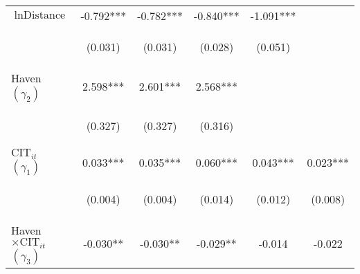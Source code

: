 \begin{center}
\begin{tabular}{lccccc}
$\ln\text{Distance (w)}$ & -0.792*** & -0.782*** & -0.840*** & -1.091*** &  \\
\vspace{4pt} & \begin{footnotesize}(0.031)\end{footnotesize} & \begin{footnotesize}(0.031)\end{footnotesize} & \begin{footnotesize}(0.028)\end{footnotesize} & \begin{footnotesize}(0.051)\end{footnotesize} & \begin{footnotesize}\end{footnotesize} \\
Haven $(\gamma_2)$ & 2.598*** & 2.601*** & 2.568*** &  &  \\
\vspace{4pt} & \begin{footnotesize}(0.327)\end{footnotesize} & \begin{footnotesize}(0.327)\end{footnotesize} & \begin{footnotesize}(0.316)\end{footnotesize} & \begin{footnotesize}\end{footnotesize} & \begin{footnotesize}\end{footnotesize} \\
$ \text{CIT}_{it}$ $(\gamma_1)$ & 0.033*** & 0.035*** & 0.060*** & 0.043*** & 0.023*** \\
\vspace{4pt} & \begin{footnotesize}(0.004)\end{footnotesize} & \begin{footnotesize}(0.004)\end{footnotesize} & \begin{footnotesize}(0.014)\end{footnotesize} & \begin{footnotesize}(0.012)\end{footnotesize} & \begin{footnotesize}(0.008)\end{footnotesize} \\
Haven$\times\text{CIT}_{it}$ $ (\gamma_3)$ & -0.030** & -0.030** & -0.029** & -0.014 & -0.022 \\

\end{tabular}
\end{center}
